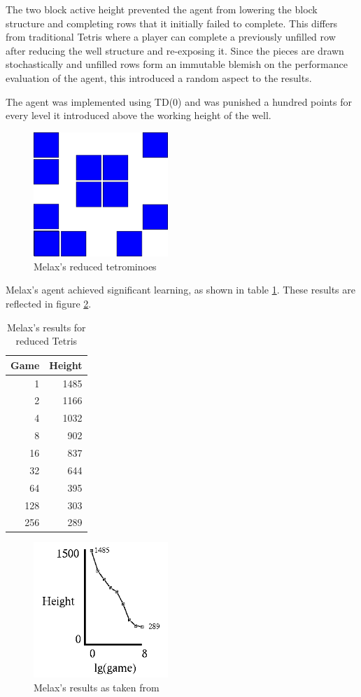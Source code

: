\documentclass{rucsthesis}
\begin{document}
The two block active height prevented the agent from lowering the block structure and completing rows that it initially failed to complete. This differs from traditional Tetris where a player can complete a previously unfilled row after reducing the well structure and re-exposing it. Since the pieces are drawn stochastically and unfilled rows form an immutable blemish on the performance evaluation of the agent, this introduced a random aspect to the results.

The agent was implemented using TD(0) and was punished a hundred points for every level it introduced above the working height of the well.

\begin{figure}[h]
\centering
\includegraphics[width=2in]{reducedblocks.png}
\caption{Melax's reduced tetrominoes}
\label{fig:melaxpieces}
\end{figure}

Melax's agent achieved significant learning, as shown in table \ref{mresults}. These results are reflected in figure \ref{fig:meres}.

\begin{table}[h]
\centering
\begin{tabular}{|r|r|}
\hline
Game & Height  \\
\hline
    1 &  1485 \\
     2  & 1166 \\
     4  & 1032 \\
     8  &  902 \\
    16  &  837 \\
    32  &  644 \\
    64  &  395 \\
   128  &  303 \\
   256   & 289 \\
\hline
\end{tabular}
\caption{Melax's results for reduced Tetris}
\label{mresults}
\end{table}

\begin{figure}[h]
\centering
\includegraphics[width=2in]{melaxresults.png}
\caption{Melax's results as taken from \cite{melaxtetris}}
\label{fig:meres}
\end{figure}
\end{document}
